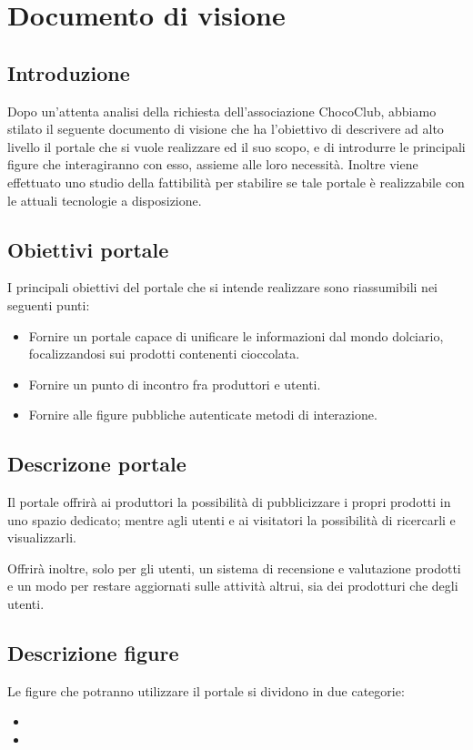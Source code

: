 \chapter{Documento di visione} 
\label{cha:documento_di_visione}

\section{Introduzione}
\label{sec:introduzione}
Dopo un'attenta analisi della richiesta dell'associazione ChocoClub, abbiamo stilato il seguente documento di visione che ha l'obiettivo di descrivere ad alto livello il portale che si vuole realizzare ed il suo scopo, e di introdurre le principali figure che interagiranno con esso, assieme alle loro necessità. Inoltre viene effettuato uno studio della fattibilità per stabilire se tale portale è realizzabile con le attuali tecnologie a disposizione.

\section{Obiettivi portale} 
\label{sec:descrizione_portale}
I principali obiettivi del portale che si intende realizzare sono riassumibili nei seguenti punti:
\begin{itemize}
	\item Fornire un portale capace di unificare le informazioni dal mondo dolciario, focalizzandosi sui prodotti contenenti cioccolata.
	\item Fornire un punto di incontro fra produttori e utenti.
	\item Fornire alle figure pubbliche autenticate metodi di interazione.
\end{itemize}

\section{Descrizone portale}
\label{sec:descrizone_portale}
Il portale offrirà ai produttori la possibilità di pubblicizzare i propri prodotti in uno spazio dedicato; mentre agli utenti e ai visitatori la possibilità di ricercarli e visualizzarli. 

Offrirà inoltre, solo per gli utenti, un sistema di recensione e valutazione prodotti e un modo per restare aggiornati sulle attività altrui, sia dei prodotturi che degli utenti.

\section{Descrizione figure} 
\label{sec:descrizionefigure}
Le figure che potranno utilizzare il portale si dividono in due categorie:
\begin{itemize}
	\item {}
	\item {}
\end{itemize}

